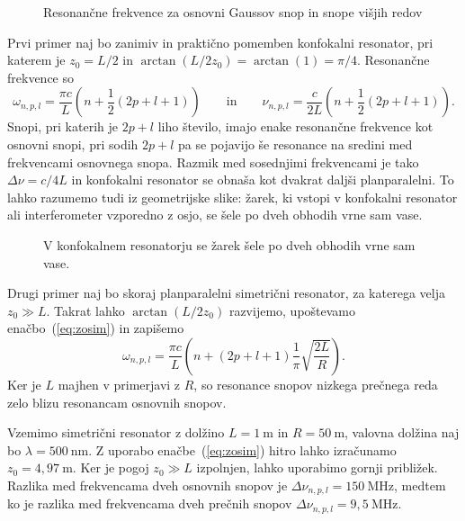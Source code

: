 \begin{figure}[h]
\centering
\def\svgwidth{110truemm} 

\caption{Resonančne frekvence za osnovni Gaussov snop in snope višjih redov}
\label{fig:crte}
\end{figure}
\pagebreak
Prvi primer naj bo zanimiv in praktično pomemben konfokalni 
resonator, pri katerem je $z_{0}=L/2$ in 
$\arctan(L/2z_{0})= \arctan(1)=\pi/4$. Resonančne frekvence so 
\begin{equation}
\omega_{n,p,l}=\frac{\pi c}{L}\left(n+\frac{1}{2}(2p+l+1)\right) \qquad \mathrm{in}
\qquad \nu_{n,p,l}=\frac{c}{2L}\left(n+\frac{1}{2}(2p+l+1)\right).
\label{eq:omega_konf}
\end{equation}
Snopi, pri katerih je $2p+l$ liho število, imajo enake resonančne frekvence kot
osnovni snopi, pri sodih $2p+l$ pa se pojavijo še resonance na sredini
med frekvencami osnovnega snopa. Razmik med so\-sed\-nji\-mi frekvencami je tako $\Delta\nu=c/4L$
in konfokalni resonator se obnaša kot dvakrat daljši planparalelni.
To lahko razumemo tudi iz geometrijske slike: žarek, ki vstopi v konfokalni
resonator ali interferometer vzporedno z osjo, se šele po dveh obhodih vrne sam
vase.

\begin{figure}[h]
\centering
\def\svgwidth{55truemm} 

\caption{V konfokalnem resonatorju se žarek šele po dveh obhodih
vrne sam vase.}
\label{fig:Konfokalni_zarek}
\end{figure}

Drugi primer naj bo skoraj planparalelni 
simetrični resonator, za katerega velja $z_{0}\gg L$. Takrat lahko $\arctan(L/2z_{0})$ razvijemo, 
upoštevamo enačbo~(\ref{eq:zosim}) in zapišemo
\begin{equation}
\omega_{n,p,l}=\frac{\pi c}{L}\left(n+(2p+l+1)\frac{1}{\pi}\sqrt{\frac{2L}{R}}\right).
\end{equation}
Ker je $L$ majhen v primerjavi z $R$, so resonance snopov nizkega prečnega reda 
zelo blizu resonancam osnovnih snopov. 

Vzemimo 
simetrični resonator z dolžino $L=1~\si{\metre}$ in $R=50~\si{\metre}$, 
valovna dolžina naj bo $\lambda= 500~\si{\nano\metre}$. Z uporabo enačbe~(\ref{eq:zosim})
hitro lahko izračunamo $z_0 = 4,97~\si{\metre}$. Ker je pogoj $z_0\gg L$ izpolnjen, lahko uporabimo
gornji približek. Razlika med frekvencama dveh osnovnih snopov je $\Delta \nu_{n,p,l} = 
150~\si{\mega\hertz}$, medtem ko je razlika med frekvencama dveh prečnih snopov
$\Delta \nu_{n,p,l} = 9,5~\si{\mega\hertz}$.

